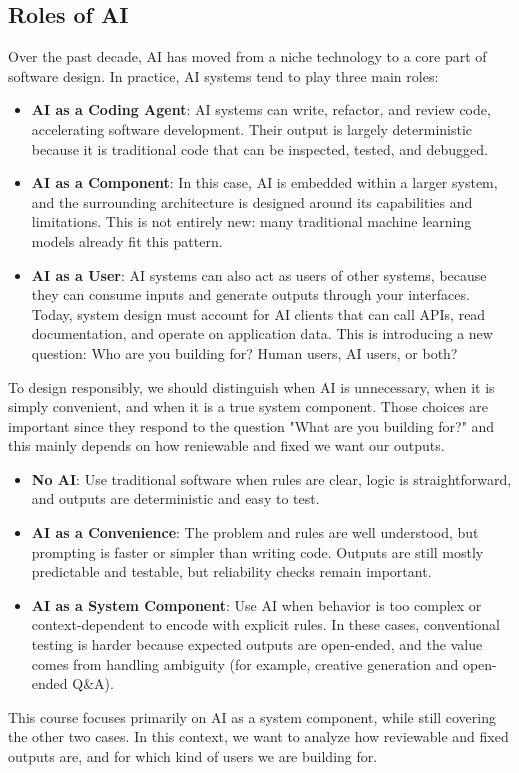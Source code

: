 \subsection{Roles of AI}
Over the past decade, AI has moved from a niche technology to a core part of software design. In practice, AI systems tend to play three main roles:
\begin{itemize}
    \item \textbf{AI as a Coding Agent}: AI systems can write, refactor, and review code, accelerating software development. 
    Their output is largely deterministic because it is traditional code that can be inspected, tested, and debugged.
    \item \textbf{AI as a Component}: In this case, AI is embedded within a larger system, and the surrounding architecture is designed around its capabilities and limitations. 
    This is not entirely new: many traditional machine learning models already fit this pattern.
    \item \textbf{AI as a User}: AI systems can also act as users of other systems, because they can consume inputs and generate outputs through your interfaces.
    Today, system design must account for AI clients that can call APIs, read documentation, and operate on application data.
    This is introducing a new question: Who are you building for? Human users, AI users, or both?
\end{itemize}
To design responsibly, we should distinguish when AI is unnecessary, when it is simply convenient, and when it is a true system component.
Those choices are important since they respond to the question "What are you building for?" and this mainly depends on how reniewable and fixed we want our outputs.
\begin{itemize}
    \item \textbf{No AI}: Use traditional software when rules are clear, logic is straightforward, and outputs are deterministic and easy to test.
    \item \textbf{AI as a Convenience}: The problem and rules are well understood, but prompting is faster or simpler than writing code.
    Outputs are still mostly predictable and testable, but reliability checks remain important.
    \item \textbf{AI as a System Component}: Use AI when behavior is too complex or context-dependent to encode with explicit rules.
    In these cases, conventional testing is harder because expected outputs are open-ended, and the value comes from handling ambiguity (for example, creative generation and open-ended Q\&A).
\end{itemize}
This course focuses primarily on AI as a system component, while still covering the other two cases.
In this context, we want to analyze how reviewable and fixed outputs are, and for which kind of users we are building for.


